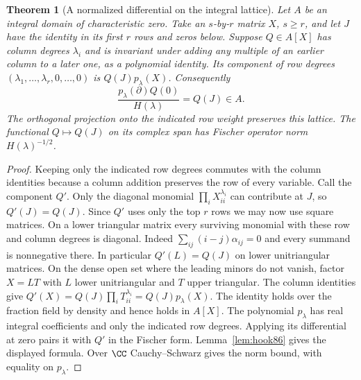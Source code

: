 \documentclass[a4paper,11pt]{article}
\newtheorem{theorem}[proposition]{Theorem}
\theoremstyle{definition}
\theoremstyle{remark}
\numberwithin{equation}{section}
\begin{document}
\begin{theorem}[A normalized differential on the integral lattice]
\label{thm:projection86}
Let \(A\) be an integral domain of characteristic zero. Take an
\(s\)-by-\(r\) matrix \(X\), \(s\ge r\), and let \(J\) have
the identity in its first \(r\) rows and zeros below. Suppose
\(Q\in A[X]\) has column degrees \(\lambda_i\) and is invariant
under adding any multiple of an earlier column to a later one, as
a polynomial identity. Its component of row degrees
\((\lambda_1,\ldots,\lambda_r,0,\ldots,0)\) is
\(Q(J)p_\lambda(X)\). Consequently
\[
       \frac{p_\lambda(\partial)Q(0)}{H(\lambda)}=Q(J)\in A .
\]
The orthogonal projection onto the indicated row weight preserves
this lattice. The functional \(Q\mapsto Q(J)\) on its complex
span has Fischer operator norm \(H(\lambda)^{-1/2}\).
\end{theorem}
\begin{proof}
Keeping only the indicated row degrees commutes with the column
identities because a column addition preserves the row of every
variable. Call the component \(Q'\). Only the diagonal monomial
\(\prod_i X_{ii}^{\lambda_i}\) can contribute at \(J\), so
\(Q'(J)=Q(J)\). Since \(Q'\) uses only the top \(r\) rows we
may now use square matrices. On a lower triangular matrix every
surviving monomial with these row and column degrees is diagonal.
Indeed \(\sum_{ij}(i-j)\alpha_{ij}=0\) and every summand is
nonnegative there. In particular \(Q'(L)=Q(J)\) on lower
unitriangular matrices. On the dense open set where the leading
minors do not vanish, factor \(X=LT\) with \(L\) lower unitriangular
and \(T\) upper triangular. The column identities give
\(Q'(X)=Q(J)\prod_i T_{ii}^{\lambda_i}=Q(J)p_\lambda(X)\).
The identity holds over the fraction field by density and hence
holds in \(A[X]\). The polynomial \(p_\lambda\) has real integral
coefficients and only the indicated row degrees. Applying its
differential at zero pairs it with \(Q'\) in the Fischer form.
Lemma~\ref{lem:hook86} gives the displayed formula. Over \(\CC\)
Cauchy--Schwarz gives the norm bound, with equality on \(p_\lambda\).
\end{proof}
\end{document}
